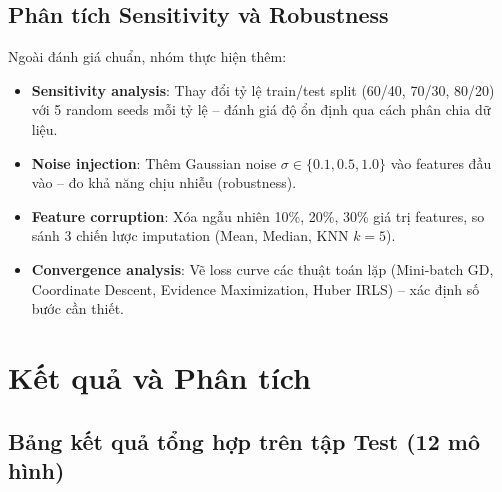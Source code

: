\documentclass[12pt, a4paper]{article}
\begin{document}
\subsection{Phân tích Sensitivity và Robustness}

Ngoài đánh giá chuẩn, nhóm thực hiện thêm:

\begin{itemize}
  \item \textbf{Sensitivity analysis}: Thay đổi tỷ lệ train/test split
        (60/40, 70/30, 80/20) với 5 random seeds mỗi tỷ lệ -- đánh giá
        độ ổn định qua cách phân chia dữ liệu.
  \item \textbf{Noise injection}: Thêm Gaussian noise
        $\sigma \in \{0.1, 0.5, 1.0\}$ vào features đầu vào -- đo khả
        năng chịu nhiễu (robustness).
  \item \textbf{Feature corruption}: Xóa ngẫu nhiên 10\%, 20\%, 30\%
        giá trị features, so sánh 3 chiến lược imputation
        (Mean, Median, KNN $k=5$).
  \item \textbf{Convergence analysis}: Vẽ loss curve các thuật toán lặp
        (Mini-batch GD, Coordinate Descent, Evidence Maximization,
        Huber IRLS) -- xác định số bước cần thiết.
\end{itemize}

\section{Kết quả và Phân tích}
\label{sec:results}

\subsection{Bảng kết quả tổng hợp trên tập Test (12 mô hình)}
\end{document}
